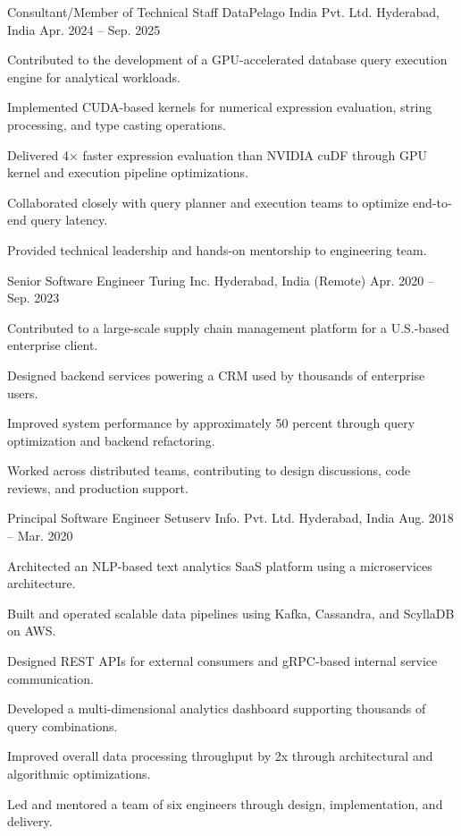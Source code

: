 \begin{cventries}
\cventry
  {Consultant/Member of Technical Staff}
  {DataPelago India Pvt. Ltd.}
  {Hyderabad, India}
  {Apr. 2024 – Sep. 2025}
  {
  \begin{cvitems}
    \item {Contributed to the development of a GPU-accelerated database query execution engine for analytical workloads.}
    \item {Implemented CUDA-based kernels for numerical expression evaluation, string processing, and type casting operations.}
    \item {Delivered 4× faster expression evaluation than NVIDIA cuDF through GPU kernel and execution pipeline optimizations.}
    \item {Collaborated closely with query planner and execution teams to optimize end-to-end query latency.}
    \item {Provided technical leadership and hands-on mentorship to engineering team.}
  \end{cvitems}
  }
  
\cventry
  {Senior Software Engineer}
  {Turing Inc.}
  {Hyderabad, India (Remote)}
  {Apr. 2020 – Sep. 2023}
  {
    \begin{cvitems}
      \item {Contributed to a large-scale supply chain management platform for a U.S.-based enterprise client.}
      \item {Designed backend services powering a CRM used by thousands of enterprise users.}
      \item {Improved system performance by approximately 50 percent through query optimization and backend refactoring.}
      \item {Worked across distributed teams, contributing to design discussions, code reviews, and production support.}
    \end{cvitems}
  }

\cventry
  {Principal Software Engineer}
  {Setuserv Info. Pvt. Ltd.}
  {Hyderabad, India}
  {Aug. 2018 – Mar. 2020}
  {
    \begin{cvitems}
      \item {Architected an NLP-based text analytics SaaS platform using a microservices architecture.}
      \item {Built and operated scalable data pipelines using Kafka, Cassandra, and ScyllaDB on AWS.}
      \item {Designed REST APIs for external consumers and gRPC-based internal service communication.}
      \item {Developed a multi-dimensional analytics dashboard supporting thousands of query combinations.}
      \item {Improved overall data processing throughput by 2x through architectural and algorithmic optimizations.}
      \item {Led and mentored a team of six engineers through design, implementation, and delivery.}
    \end{cvitems}
  }


\end{cventries}
